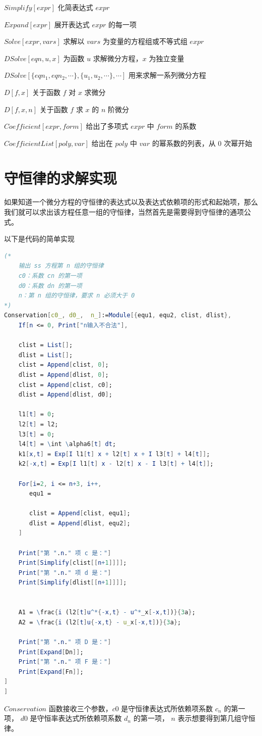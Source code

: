 $Simplify[expr]$  \quad   化简表达式 $expr$

$Expand[expr]$ \quad    展开表达式 $expr$ 的每一项

$Solve[expr, vars]$  \quad 求解以 $vars$ 为变量的方程组或不等式组 $expr$

$DSolve[eqn, u, x]$ \quad  为函数 $u$ 求解微分方程，$x$ 为独立变量

$DSolve[\{eqn_1, eqn_2, \cdots \}, \{u_1, u_2, \cdots \}, \cdots ]$ \quad  用来求解一系列微分方程

$D[f,x]$     \quad  关于函数 $f$ 对 $x$ 求微分

$D[f,{x,n}]$     \quad     关于函数 $f$ 求 $x$ 的 $n$ 阶微分

$Coefficient[expr, form]$   \quad  给出了多项式 $expr$ 中 $form$ 的系数

$CoefficientList[poly, var]$   \quad  给出在 $poly$ 中 $var$ 的幂系数的列表，从 0 次幂开始

\section{守恒律的求解实现}
如果知道一个微分方程的守恒律的表达式以及表达式依赖项的形式和起始项，那么我们就可以求出该方程任意一组的守恒律，当然首先是需要得到守恒律的通项公式。

以下是代码的简单实现
\begin{lstlisting}[language=Mathematica,caption=守恒律求解的实现]
(*
	输出 ss 方程第 n 组的守恒律
	c0：系数 cn 的第一项
	d0：系数 dn 的第一项
	n：第 n 组的守恒律，要求 n 必须大于 0
*)
Conservation[c0_, d0_,  n_]:=Module[{equ1, equ2, clist, dlist},
	If[n <= 0, Print["n输入不合法"],
	
	clist = List[];
	dlist = List[];
	clist = Append[clist, 0];
	dlist = Append[dlist, 0];
	clist = Append[clist, c0];
	dlist = Append[dlist, d0];

    l1[t] = 0;
    l2[t] = l2;
    l3[t] = 0;
    l4[t] = \int \alpha6[t] dt;
    k1[x,t] = Exp[I l1[t] x + l2[t] x + I l3[t] + l4[t]];
    k2[-x,t] = Exp[I l1[t] x - l2[t] x - I l3[t] + l4[t]];
	
    For[i=2, i <= n+3, i++,
	   equ1 = 
	
	   clist = Append[clist, equ1];
	   dlist = Append[dlist, equ2];
	]

	Print["第 ".n." 项 c 是："]
	Print[Simplify[clist[[n+1]]]];
	Print["第 ".n." 项 d 是："]
	Print[Simplify[dlist[[n+1]]]];
    
    
    A1 = \frac{i (l2[t]u^*{-x,t} - u^*_x[-x,t])}{3a};
    A2 = \frac{i (l2[t]u{-x,t} - u_x[-x,t])}{3a};

	Print["第 ".n." 项 D 是："]
	Print[Expand[Dn]];
	Print["第 ".n." 项 F 是："]
	Print[Expand[Fn]];
]
]

\end{lstlisting}
$Conservation$ 函数接收三个参数，$c0$ 是守恒律表达式所依赖项系数 $c_n$ 的第一项， $d0$ 是守恒率表达式所依赖项系数 $d_n$ 的第一项， $n$ 表示想要得到第几组守恒律。


